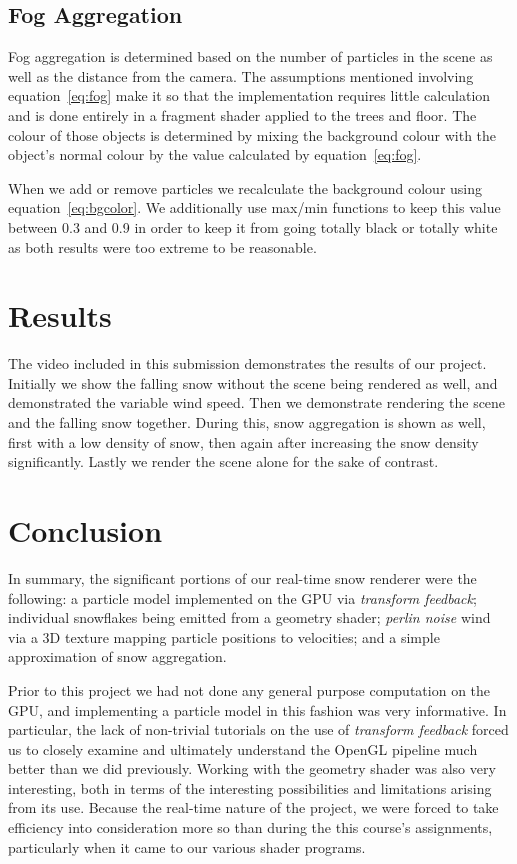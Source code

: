 \documentclass[conference]{acmsiggraph}
\begin{document}
\subsection{Fog Aggregation}
Fog aggregation is determined based on the number of particles in the scene as well as the distance from the camera. The assumptions mentioned involving equation~\ref{eq:fog} make it so that the implementation requires little calculation and is done entirely in a fragment shader applied to the trees and floor. The colour of those objects is determined by mixing the background colour with the object's normal colour by the value calculated by equation~\ref{eq:fog}.

When we add or remove particles we recalculate the background colour using equation~\ref{eq:bgcolor}. We additionally use max/min functions to keep this value between 0.3 and 0.9 in order to keep it from going totally black or totally white as both results were too extreme to be reasonable.

\section{Results}
The video included in this submission demonstrates the results of our project. Initially we show the falling snow without the scene being rendered as well, and demonstrated the variable wind speed. Then we demonstrate rendering the scene and the falling snow together. During this, snow aggregation is shown as well, first with a low density of snow, then again after increasing the snow density significantly. Lastly we render the scene alone for the sake of contrast. 

\section{Conclusion}
In summary, the significant portions of our real-time snow renderer were the following: a particle model implemented on the GPU via \textit{transform feedback}; individual snowflakes being emitted from a geometry shader; \textit{perlin noise} wind via a 3D texture mapping particle positions to velocities; and a simple approximation of snow aggregation.

Prior to this project we had not done any general purpose computation on the GPU, and implementing a particle model in this fashion was very informative. In particular, the lack of non-trivial tutorials on the use of \textit{transform feedback} forced us to closely examine and ultimately understand the OpenGL pipeline much better than we did previously. Working with the geometry shader was also very interesting, both in terms of the interesting possibilities and limitations arising from its use. Because the real-time nature of the project, we were forced to take efficiency into consideration more so than during the this course's assignments, particularly when it came to our various shader programs.
\end{document}
